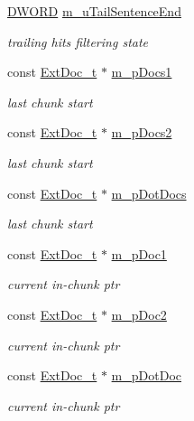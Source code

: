 \begin{DoxyCompactItemize}
\hyperlink{sphinxstd_8h_a798af1e30bc65f319c1a246cecf59e39}{D\-W\-O\-R\-D} \hyperlink{classExtUnit__c_aa7d3a2f432459a55c62e9d8e7ccbe06a}{m\-\_\-u\-Tail\-Sentence\-End}
\begin{DoxyCompactList}\small\item\em trailing hits filtering state \end{DoxyCompactList}\item 
const \hyperlink{structExtDoc__t}{Ext\-Doc\-\_\-t} $\ast$ \hyperlink{classExtUnit__c_a1822c52205d27529018c54c55aee9012}{m\-\_\-p\-Docs1}
\begin{DoxyCompactList}\small\item\em last chunk start \end{DoxyCompactList}\item 
const \hyperlink{structExtDoc__t}{Ext\-Doc\-\_\-t} $\ast$ \hyperlink{classExtUnit__c_a6fdbefe3c3cda0230675f702ded7c418}{m\-\_\-p\-Docs2}
\begin{DoxyCompactList}\small\item\em last chunk start \end{DoxyCompactList}\item 
const \hyperlink{structExtDoc__t}{Ext\-Doc\-\_\-t} $\ast$ \hyperlink{classExtUnit__c_a9f1f0ff25b238b440c8dc5a48f6f1757}{m\-\_\-p\-Dot\-Docs}
\begin{DoxyCompactList}\small\item\em last chunk start \end{DoxyCompactList}\item 
const \hyperlink{structExtDoc__t}{Ext\-Doc\-\_\-t} $\ast$ \hyperlink{classExtUnit__c_accbc2b53d43ba220a4edc3d54a75501c}{m\-\_\-p\-Doc1}
\begin{DoxyCompactList}\small\item\em current in-\/chunk ptr \end{DoxyCompactList}\item 
const \hyperlink{structExtDoc__t}{Ext\-Doc\-\_\-t} $\ast$ \hyperlink{classExtUnit__c_a6ac3e6d0fea9e516b82b16af493a92ee}{m\-\_\-p\-Doc2}
\begin{DoxyCompactList}\small\item\em current in-\/chunk ptr \end{DoxyCompactList}\item 
const \hyperlink{structExtDoc__t}{Ext\-Doc\-\_\-t} $\ast$ \hyperlink{classExtUnit__c_af8b0549863ca17a50fef390c1c5f18cb}{m\-\_\-p\-Dot\-Doc}
\begin{DoxyCompactList}\small\item\em current in-\/chunk ptr \end{DoxyCompactList}\item 

\end{DoxyCompactItemize}
